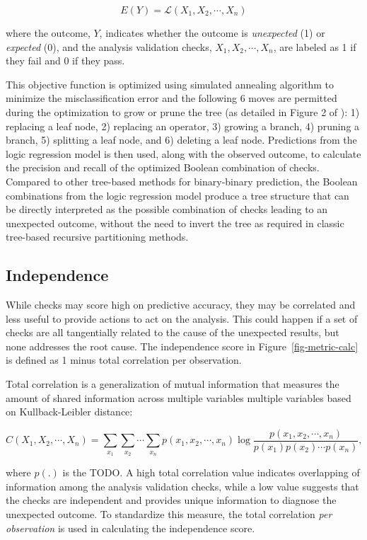 \documentclass[
  12pt,
]{interact}
\begin{document}
\[E(Y) = \mathcal{L}(X_1, X_2, \cdots, X_n)\]

where the outcome, \(Y\), indicates whether the outcome is
\emph{unexpected} (1) or \emph{expected} (0), and the analysis
validation checks, \(X_1, X_2, \cdots, X_n\), are labeled as 1 if they
fail and 0 if they pass.

This objective function is optimized using simulated annealing algorithm
to minimize the misclassification error and the following 6 moves are
permitted during the optimization to grow or prune the tree (as detailed
in Figure 2 of \citet{ruczinski_logic_2003}): 1) replacing a leaf node,
2) replacing an operator, 3) growing a branch, 4) pruning a branch, 5)
splitting a leaf node, and 6) deleting a leaf node. Predictions from the
logic regression model is then used, along with the observed outcome, to
calculate the precision and recall of the optimized Boolean combination
of checks. Compared to other tree-based methods for binary-binary
prediction, the Boolean combinations from the logic regression model
produce a tree structure that can be directly interpreted as the
possible combination of checks leading to an unexpected outcome, without
the need to invert the tree as required in classic tree-based recursive
partitioning methods.

\subsection{Independence}\label{independence}

While checks may score high on predictive accuracy, they may be
correlated and less useful to provide actions to act on the analysis.
This could happen if a set of checks are all tangentially related to the
cause of the unexpected results, but none addresses the root cause. The
independence score in Figure~\ref{fig-metric-calc} is defined as 1 minus
total correlation per observation.

Total correlation is a generalization of mutual information that
measures the amount of shared information across multiple variables
multiple variables based on Kullback-Leibler distance:

\[C(X_1, X_2, \cdots, X_n) = \sum_{x_1} \sum_{x_2} \cdots \sum_{x_n} p(x_1, x_2, \cdots, x_n) \log \frac{p(x_1, x_2, \cdots, x_n)}{p(x_1)p(x_2) \cdots p(x_n)},\]

where \(p(.)\) is the TODO. A high total correlation value indicates
overlapping of information among the analysis validation checks, while a
low value suggests that the checks are independent and provides unique
information to diagnose the unexpected outcome. To standardize this
measure, the total correlation \emph{per observation} is used in
calculating the independence score.
\end{document}
